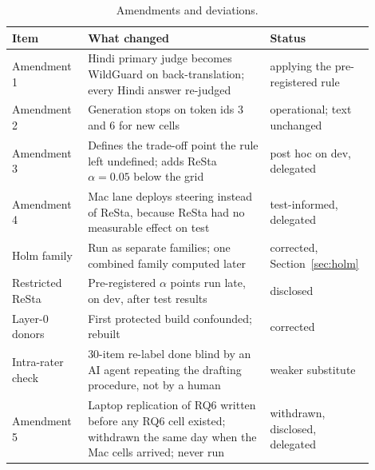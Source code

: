 \begin{table}[tbp]
\centering
\caption{Amendments and deviations.}\label{tab:amend}
\scriptsize
\begin{tabular}{p{0.2\linewidth}p{0.48\linewidth}p{0.22\linewidth}}
\toprule
Item & What changed & Status \\
\midrule
Amendment 1 & Hindi primary judge becomes WildGuard on back-translation; every Hindi answer re-judged & applying the pre-registered rule \\
Amendment 2 & Generation stops on token ids 3 and 6 for new cells & operational; text unchanged \\
Amendment 3 & Defines the trade-off point the rule left undefined; adds ReSta $\alpha=0.05$ below the grid & post hoc on dev, delegated \\
Amendment 4 & Mac lane deploys steering instead of ReSta, because ReSta had no measurable effect on test & test-informed, delegated \\
Holm family & Run as separate families; one combined family computed later & corrected, Section~\ref{sec:holm} \\
Restricted ReSta & Pre-registered $\alpha$ points run late, on dev, after test results & disclosed \\
Layer-0 donors & First protected build confounded; rebuilt & corrected \\
Intra-rater check & 30-item re-label done blind by an AI agent repeating the drafting procedure, not by a human & weaker substitute \\
Amendment 5 & Laptop replication of RQ6 written before any RQ6 cell existed; withdrawn the same day when the Mac cells arrived; never run & withdrawn, disclosed, delegated \\
\bottomrule
\end{tabular}
\end{table}

